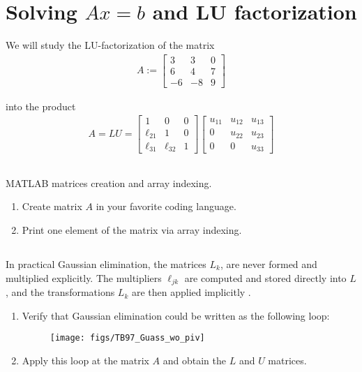 \documentclass[11pt,letterpaper]{article}
\begin{document}
\section{Solving $Ax=b$ and LU factorization}
We will study the LU-factorization of the matrix
\begin{align*}
    A:=
  \begin{bmatrix}
    3  &   3   &    0\\
    6  &   4   &  7\\
    -6 &  -8   &   9
  \end{bmatrix}
\end{align*}

into the product
\begin{align*}
A = LU =
\begin{bmatrix}
1 & 0 & 0 \\
    \ell_{21} & 1 & 0\\
    \ell_{31} & \ell_{32} & 1
\end{bmatrix}
\begin{bmatrix}
    u_{11} & u_{12} & u_{13} \\
    0 & u_{22} & u_{23}\\
    0 & 0 & u_{33}
\end{bmatrix}
\end{align*}

\subsection{}
MATLAB matrices creation and array indexing.
\begin{enumerate}
    \item Create matrix $A$ in your favorite coding language.
    \item Print one element of the matrix via array indexing.
\end{enumerate}

\subsection{}
In practical Gaussian elimination, the matrices $L_k$, are never formed and multiplied explicitly. The multipliers $\ell_{jk}$ are computed and stored directly into $L$, and the transformations $L_k$ are then applied implicitly \cite[p.151]{TrefethenBau_97}.

\begin{enumerate}
    \item Verify that Gaussian elimination could be written as the following loop:
    \begin{figure}[H]
        \centering
        \texttt{[image: figs/TB97\_Guass\_wo\_piv]}
    \end{figure}
    \item Apply this loop at the matrix $A$ and obtain the $L$ and $U$ matrices.
\end{enumerate}
\end{document}

